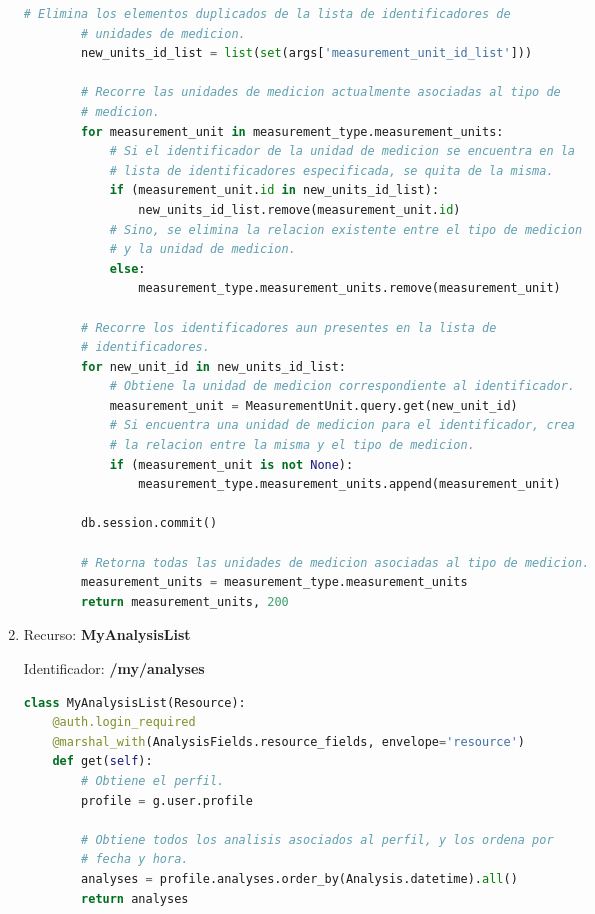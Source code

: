 \documentclass[a4paper,12pt]{article}
\begin{document}
\begin{enumerate}
\begin{lstlisting}[language=Python]
        # Elimina los elementos duplicados de la lista de identificadores de
        # unidades de medicion.
        new_units_id_list = list(set(args['measurement_unit_id_list']))

        # Recorre las unidades de medicion actualmente asociadas al tipo de
        # medicion.
        for measurement_unit in measurement_type.measurement_units:
            # Si el identificador de la unidad de medicion se encuentra en la
            # lista de identificadores especificada, se quita de la misma.
            if (measurement_unit.id in new_units_id_list):
                new_units_id_list.remove(measurement_unit.id)
            # Sino, se elimina la relacion existente entre el tipo de medicion
            # y la unidad de medicion.
            else:
                measurement_type.measurement_units.remove(measurement_unit)

        # Recorre los identificadores aun presentes en la lista de
        # identificadores.
        for new_unit_id in new_units_id_list:
            # Obtiene la unidad de medicion correspondiente al identificador.
            measurement_unit = MeasurementUnit.query.get(new_unit_id)
            # Si encuentra una unidad de medicion para el identificador, crea
            # la relacion entre la misma y el tipo de medicion.
            if (measurement_unit is not None):
                measurement_type.measurement_units.append(measurement_unit)

        db.session.commit()

        # Retorna todas las unidades de medicion asociadas al tipo de medicion.
        measurement_units = measurement_type.measurement_units
        return measurement_units, 200
\end{lstlisting}

\item Recurso: \textbf{MyAnalysisList}

Identificador: \textbf{/my/analyses}

\begin{lstlisting}[language=Python]
class MyAnalysisList(Resource):
    @auth.login_required
    @marshal_with(AnalysisFields.resource_fields, envelope='resource')
    def get(self):
        # Obtiene el perfil.
        profile = g.user.profile

        # Obtiene todos los analisis asociados al perfil, y los ordena por
        # fecha y hora.
        analyses = profile.analyses.order_by(Analysis.datetime).all()
        return analyses


\end{lstlisting}
\end{enumerate}
\end{document}
